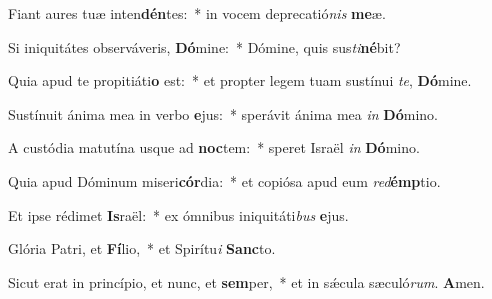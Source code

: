 Fiant aures tuæ inten\textbf{dén}tes:~* in vocem deprecatió\textit{nis} \textbf{me}æ.

Si iniquitátes observáveris, \textbf{Dó}mine:~* Dómine, quis sus\textit{ti}\textbf{né}bit?

Quia apud te propitiáti\textbf{o} est:~* et propter legem tuam sustínui \textit{te}, \textbf{Dó}mine.

Sustínuit ánima mea in verbo \textbf{e}jus:~* sperávit ánima mea \textit{in} \textbf{Dó}mino.

A custódia matutína usque ad \textbf{noc}tem:~* speret Israël \textit{in} \textbf{Dó}mino.

Quia apud Dóminum miseri\textbf{cór}dia:~* et copiósa apud eum \textit{red}\textbf{émp}tio.

Et ipse rédimet \textbf{Is}raël:~* ex ómnibus iniquitáti\textit{bus} \textbf{e}jus.

Glória Patri, et \textbf{Fí}lio,~* et Spirítu\textit{i} \textbf{Sanc}to.

Sicut erat in princípio, et nunc, et \textbf{sem}per,~* et in sǽcula sæculó\textit{rum}. \textbf{A}men.


